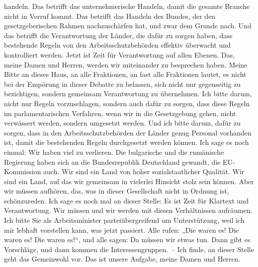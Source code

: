 \documentclass{article}
\begin{document}
handeln. Das betrifft das unternehmerische Handeln, damit die gesamte Branche nicht in Verruf kommt. Das betrifft das Handeln des Bundes, der den gesetzgeberischen Rahmen nachzuschärfen hat, und zwar dem Grunde nach. Und das betrifft die Verantwortung der Länder, die dafür zu sorgen haben, dass bestehende Regeln von den Arbeitsschutzbehörden effektiv überwacht und kontrolliert werden.  Jetzt ist Zeit für Verantwortung auf allen Ebenen. Das, meine Damen und Herren, werden wir miteinander zu besprechen haben. Meine Bitte an dieses Haus, an alle Fraktionen, an fast alle Fraktionen  lautet, es nicht bei der Empörung in dieser Debatte zu belassen, sich nicht nur gegenseitig zu bezichtigen, sondern gemeinsam Verantwortung zu übernehmen. Ich bitte darum, nicht nur Regeln vorzuschlagen, sondern auch dafür zu sorgen, dass diese Regeln im parlamentarischen Verfahren, wenn wir in die Gesetzgebung gehen, nicht verwässert werden, sondern umgesetzt werden. Und ich bitte darum, dafür zu sorgen, dass in den Arbeitsschutzbehörden der Länder genug Personal vorhanden ist, damit die bestehenden Regeln durchgesetzt werden können. Ich sage es noch einmal: Wir haben viel zu verlieren. Die bulgarische und die rumänische Regierung haben sich an die Bundesrepublik Deutschland gewandt, die EU-Kommission auch. Wir sind ein Land von hoher sozialstaatlicher Qualität. Wir sind ein Land, auf das wir gemeinsam in vielerlei Hinsicht stolz sein können. Aber wir müssen aufhören, das, was in dieser Gesellschaft nicht in Ordnung ist, schönzureden. Ich sage es noch mal an dieser Stelle: Es ist Zeit für Klartext und Verantwortung. Wir müssen und wir werden mit diesen Verhältnissen aufräumen. Ich bitte Sie als Arbeitsminister parteiübergreifend um Unterstützung, weil ich mir lebhaft vorstellen kann, was jetzt passiert. Alle rufen: „Die waren es! Die waren es! Die waren es!“, und alle sagen: Da müssen wir etwas tun. Dann gibt es Vorschläge, und dann kommen die Interessengruppen. – Ich finde, an dieser Stelle geht das Gemeinwohl vor. Das ist unsere Aufgabe, meine Damen und Herren.  
\end{document}
